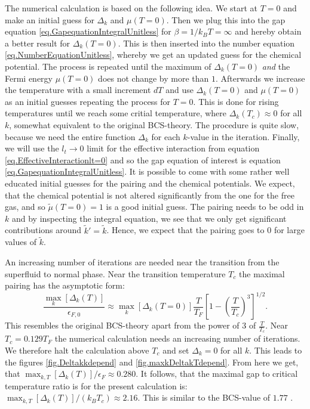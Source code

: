 The numerical calculation is based on the following idea. We start at $T = 0$ and make an initial guess for $\Delta_k$ and $\mu(T=0)$. Then we plug this into the gap equation \eqref{eq.GapequationIntegralUnitless} for $\beta = 1/k_BT = \infty$ and hereby obtain a better result for $\Delta_k(T=0)$. This is then inserted into the number equation \eqref{eq.NumberEquationUnitless}, whereby we get an updated guess for the chemical potential. The process is repeated until the maximum of $\Delta_k(T=0)$ \textit{and} the Fermi energy $\mu( T=0 )$ does not change by more than $1$\textperthousand. Afterwards we increase the temperature with a small increment $dT$ and use $\Delta_k(T=0)$ and $\mu( T=0 )$ as an initial guesses repeating the process for $T=0$. This is done for rising temperatures until we reach some critial temperature, where $\Delta_k(T_c)\approx 0$ for all $k$, somewhat equivalent to the original BCS-theory\cite{Tinkham,LandauStatPhys2,PlischkeStatPhys}. The procedure is quite slow, because we need the entire function $\Delta_k$ for each $k$-value in the iteration. Finally, we will use the $l_t \to 0$ limit for the effective interaction from equation \eqref{eq.EffectiveInteractionlt=0} and so the gap equation of interest is equation \eqref{eq.GapequationIntegralUnitless}. It is possible to come with some rather well educated initial guesses for the pairing and the chemical potentials. We expect, that the chemical potential is not altered significantly from the one for the free gas, and so $\tilde{\mu}(T = 0) = 1$ is a good initial guess. The pairing needs to be odd in $k$ and by inspecting the integral equation, we see that we only get significant contributions around $\tilde{k}' = \tilde{k}$. Hence, we expect that the pairing goes to 0 for large values of $\tilde{k}$.  

An increasing number of iterations are needed near the transition from the superfluid to normal phase. Near the transition temperature $T_c$ the maximal pairing has the asymptotic form:
\begin{equation}
\frac{\max_{k}[\Delta_k(T)]}{\epsilon_{F,0}} \approx \max_k[\Delta_{k}(T=0)]\frac{T}{T_F}\left[1 - \left(\frac{T}{T_c}\right)^3\right]^{1/2}. 
\label{eq.maxpairingasymp}
\end{equation}
This resembles the original BCS-theory apart from the power of 3 of $\frac{T}{T_c}$. Near $T_c = 0.129 T_F$ the numerical calculation needs an increasing number of iterations. We therefore halt the calculation above $T_c$ and set $\Delta_k = 0$ for all $k$. This leads to the figures \ref{fig.Deltakkdepend} and \ref{fig.maxkDeltakTdepend}. From here we get, that $\max_{k,T}[\Delta_k(T)]/\epsilon_F \approx 0.280$. It follows, that the maximal gap to critical temperature ratio is for the present calculation is: $\max_{k,T}[\Delta_k(T)]/(k_B T_c) \approx 2.16$. This is similar to the BCS-value of $1.77$ \cite{BruusFlensberg}.  

